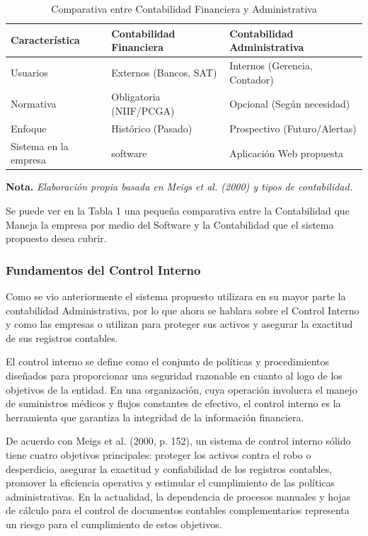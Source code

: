 \begin{table}[h]
    \centering
    \caption{Comparativa entre Contabilidad Financiera y Administrativa}
    \vspace{0.2cm}
    \begin{tabular}{p{3cm} p{5cm} p{5cm}}
        \toprule
        \textbf{Característica} & \textbf{Contabilidad Financiera} & \textbf{Contabilidad Administrativa} \\
        \midrule
        Usuarios & Externos (Bancos, SAT) & Internos (Gerencia, Contador) \\
        Normativa & Obligatoria (NIIF/PCGA) & Opcional (Según necesidad) \\
        Enfoque & Histórico (Pasado) & Prospectivo (Futuro/Alertas) \\
        Sistema en la empresa & software & Aplicación Web propuesta \\
        \bottomrule
    \end{tabular}
    
    \vspace{0.2cm}
    \raggedright \small \textbf{Nota.} \textit{Elaboración propia basada en Meigs et al. (2000) y tipos de contabilidad.}
\end{table}

Se puede ver en la Tabla 1 una pequeña comparativa entre la Contabilidad que Maneja la empresa por medio del Software y la Contabilidad que el sistema propuesto desea cubrir.

\subsubsection{Fundamentos del Control Interno}

Como se vio anteriormente el sistema propuesto utilizara en su mayor parte la contabilidad Administrativa, por lo que ahora se hablara sobre el Control Interno y como las empresas o utilizan para proteger sus activos y asegurar la exactitud de sus registros contables.

El control interno se define como el conjunto de políticas y procedimientos diseñados para proporcionar una seguridad razonable en cuanto al logo de los objetivos de la entidad. En una organización, cuya operación involucra el manejo de suministros médicos y flujos constantes de efectivo, el control interno es la herramienta que garantiza la integridad de la información financiera.

De acuerdo con Meigs et al. (2000, p. 152), un sistema de control interno sólido tiene cuatro objetivos principales: proteger los activos contra el robo o desperdicio, asegurar la exactitud y confiabilidad de los registros contables, promover la eficiencia operativa y estimular el cumplimiento de las políticas administrativas. En la actualidad, la dependencia de procesos manuales y hojas de cálculo para el control de documentos contables complementarios representa un riesgo para el cumplimiento de estos objetivos.

